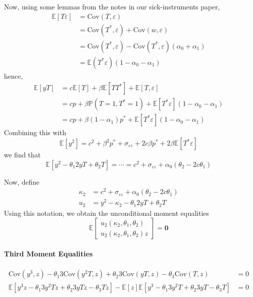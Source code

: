 \documentclass[12pt]{article}
\begin{document}
Now, using some lemmas from the notes in our sick-instruments paper,
\begin{align*}
  \mathbb{E}[T\varepsilon] &= \mbox{Cov}(T,\varepsilon) \\
  &= \mbox{Cov}(T^*,\varepsilon) + \mbox{Cov}(w,\varepsilon)\\
  &= \mbox{Cov}(T^*,\varepsilon) - \mbox{Cov}(T^*,\varepsilon)(\alpha_0 + \alpha_1)\\
  &= \mathbb{E}(T^*\varepsilon)(1 - \alpha_0 - \alpha_1)
\end{align*}
hence,
\begin{align*}
  \mathbb{E}[yT] &= c \mathbb{E}[T] + \beta \mathbb{E}[TT^*] + \mathbb{E}\left[T,\varepsilon \right] \\
  &= cp + \beta \mathbb{P}(T=1,T^*=1) + \mathbb{E}[T^*\varepsilon](1 - \alpha_0 - \alpha_1)\\
  &= cp + \beta (1 - \alpha_1)p^* + \mathbb{E}[T^*\varepsilon](1 - \alpha_0 - \alpha_1)
\end{align*}
Combining this with
\[
  \mathbb{E}[y^2] = c^2 + \beta^2 p^* + \sigma_{\varepsilon\varepsilon} + 2 c\beta p^* + 2 \beta \mathbb{E}[T^*\varepsilon]
\]
we find that 
\[
  \mathbb{E}\left[ y^2 - \theta_1 2yT + \theta_2 T \right] = \cdots = c^2 + \sigma_{\varepsilon\varepsilon} + \alpha_0(\theta_2 - 2c\theta_1)
\]

Now, define
\begin{align*}
  \kappa_2 &= c^2 + \sigma_{\varepsilon\varepsilon} + \alpha_0 (\theta_2 - 2c \theta_1)\\
  u_2 &= y^2 - \kappa_2 - \theta_1 2 yT + \theta_2 T
\end{align*}
Using this notation, we obtain the unconditional moment equalities
\[
  \mathbb{E}\left[
  \begin{array}{l}
    u_2(\kappa_2, \theta_1, \theta_2)\\ 
    u_2(\kappa_2, \theta_1, \theta_2) z
  \end{array}
\right] = \mathbf{0}
\]


\paragraph{Third Moment Equalities} 
\begin{align*}
  \mbox{Cov}(y^3,z) - \theta_1 3 \mbox{Cov}(y^2T,z) + \theta_2 3\mbox{Cov}(yT,z) - \theta_3\mbox{Cov}(T,z) &= 0\\
  \mathbb{E}\left[ y^3 z - \theta_1 3 y^2 Tz + \theta_2 3 yTz - \theta_3 Tz \right] - \mathbb{E}[z]\mathbb{E}\left[ y^3 - \theta_1 3 y^2T + \theta_2 3 yT - \theta_3 T \right] &= 0
\end{align*}
\end{document}
